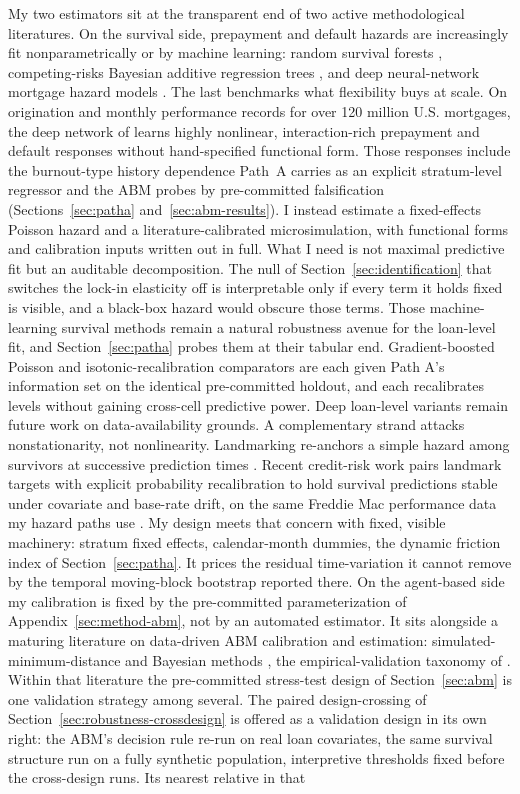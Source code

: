\documentclass[12pt]{article}
\begin{document}
My two estimators sit at the transparent end of two active methodological literatures. On the survival side, prepayment and default hazards are increasingly fit nonparametrically or by machine learning: random survival forests \citep{ishwaran2008}, competing-risks Bayesian additive regression trees \citep{sparapani2020}, and deep neural-network mortgage hazard models \citep{sadhwani2021}. The last benchmarks what flexibility buys at scale. On origination and monthly performance records for over 120 million U.S. mortgages, the deep network of \citet{sadhwani2021} learns highly nonlinear, interaction-rich prepayment and default responses without hand-specified functional form. Those responses include the burnout-type history dependence Path~A carries as an explicit stratum-level regressor and the ABM probes by pre-committed falsification (Sections~\ref{sec:patha} and~\ref{sec:abm-results}). I instead estimate a fixed-effects Poisson hazard and a literature-calibrated microsimulation, with functional forms and calibration inputs written out in full. What I need is not maximal predictive fit but an auditable decomposition. The null of Section~\ref{sec:identification} that switches the lock-in elasticity off is interpretable only if every term it holds fixed is visible, and a black-box hazard would obscure those terms. Those machine-learning survival methods remain a natural robustness avenue for the loan-level fit, and Section~\ref{sec:patha} probes them at their tabular end. Gradient-boosted Poisson and isotonic-recalibration comparators are each given Path A's information set on the identical pre-committed holdout, and each recalibrates levels without gaining cross-cell predictive power. Deep loan-level variants remain future work on data-availability grounds. A complementary strand attacks nonstationarity, not nonlinearity. Landmarking re-anchors a simple hazard among survivors at successive prediction times \citep{vanhouwelingen2007,putter2022}. Recent credit-risk work pairs landmark targets with explicit probability recalibration to hold survival predictions stable under covariate and base-rate drift, on the same Freddie Mac performance data my hazard paths use \citep{peng2026}. My design meets that concern with fixed, visible machinery: stratum fixed effects, calendar-month dummies, the dynamic friction index of Section~\ref{sec:patha}. It prices the residual time-variation it cannot remove by the temporal moving-block bootstrap reported there. On the agent-based side my calibration is fixed by the pre-committed parameterization of Appendix~\ref{sec:method-abm}, not by an automated estimator. It sits alongside a maturing literature on data-driven ABM calibration and estimation: simulated-minimum-distance and Bayesian methods \citep{grazzini2017,platt2020}, the empirical-validation taxonomy of \citet{fagiolo2007}. Within that literature the pre-committed stress-test design of Section~\ref{sec:abm} is one validation strategy among several. The paired design-crossing of Section~\ref{sec:robustness-crossdesign} is offered as a validation design in its own right: the ABM's decision rule re-run on real loan covariates, the same survival structure run on a fully synthetic population, interpretive thresholds fixed before the cross-design runs. Its nearest relative in that 
\end{document}
